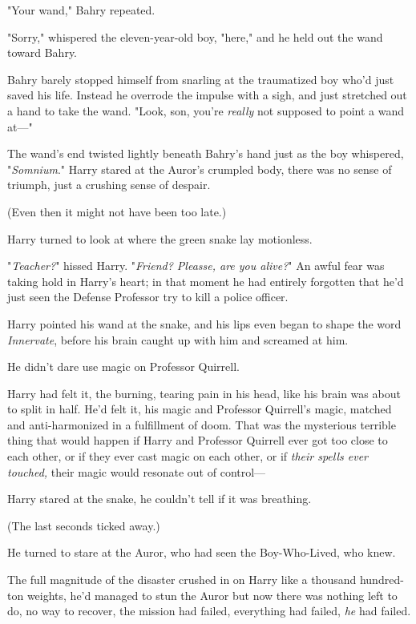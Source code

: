 "Your wand," Bahry repeated.

"Sorry," whispered the eleven-year-old boy, "here," and he held out the wand 
toward Bahry.

Bahry barely stopped himself from snarling at the traumatized boy who'd just 
saved his life. Instead he overrode the impulse with a sigh, and just stretched 
out a hand to take the wand. "Look, son, you're \emph{really} not supposed to 
point a wand at---"

The wand's end twisted lightly beneath Bahry's hand just as the boy whispered, 
"\emph{Somnium}."
\sbreak
Harry stared at the Auror's crumpled body, there was no sense of triumph, just 
a crushing sense of despair.

(Even then it might not have been too late.)

Harry turned to look at where the green snake lay motionless.

"\emph{Teacher?}" hissed Harry. "\emph{Friend? Pleasse, are you alive?}" An 
awful fear was taking hold in Harry's heart; in that moment he had entirely 
forgotten that he'd just seen the Defense Professor try to kill a police 
officer.

Harry pointed his wand at the snake, and his lips even began to shape the word 
\emph{Innervate}, before his brain caught up with him and screamed at him.

He didn't dare use magic on Professor Quirrell.

Harry had felt it, the burning, tearing pain in his head, like his brain was 
about to split in half. He'd felt it, his magic and Professor Quirrell's magic, 
matched and anti-harmonized in a fulfillment of doom. That was the mysterious 
terrible thing that would happen if Harry and Professor Quirrell ever got too 
close to each other, or if they ever cast magic on each other, or if 
\emph{their spells ever touched,} their magic would resonate out of control---

Harry stared at the snake, he couldn't tell if it was breathing.

(The last seconds ticked away.)

He turned to stare at the Auror, who had seen the Boy-Who-Lived, who knew.

The full magnitude of the disaster crushed in on Harry like a thousand 
hundred-ton weights, he'd managed to stun the Auror but now there was nothing 
left to do, no way to recover, the mission had failed, everything had failed, 
\emph{he} had failed.

